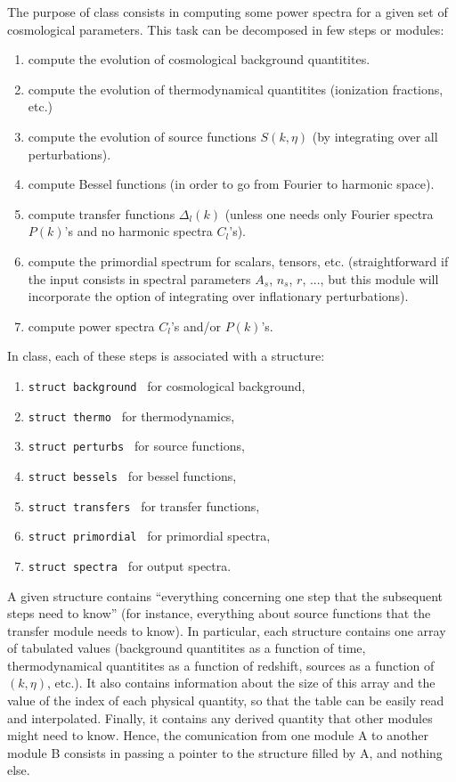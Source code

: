 \documentclass{article}
\begin{document}
The purpose of {\sc class} consists in computing some power spectra for a
given set of cosmological parameters. This task can be decomposed in few steps
or modules:
\begin{enumerate}
\item
compute the evolution of cosmological background quantitites.
\item
compute the evolution of thermodynamical quantitites (ionization fractions, etc.)
\item
compute the evolution of source functions $S(k,\eta)$ (by integrating over all perturbations).
\item
compute Bessel functions (in order to go from Fourier to harmonic space).
\item
compute transfer functions $\Delta_l(k)$ (unless one needs only Fourier spectra $P(k)$'s and no harmonic spectra $C_l$'s).
\item
compute the primordial spectrum for scalars, tensors, etc.
(straightforward if the input consists in spectral parameters $A_s$,
$n_s$, $r$, ..., but this module will incorporate the option of integrating
over inflationary perturbations).
\item
compute power spectra $C_l$'s and/or $P(k)$'s.
\end{enumerate}
In {\sc class}, each of these steps is associated with a structure:
\begin{enumerate}
\item {\tt  struct background }      for cosmological background,
\item {\tt  struct thermo      }     for thermodynamics,
\item {\tt  struct perturbs     }    for source functions,
\item {\tt  struct bessels  }        for bessel functions,
\item {\tt  struct transfers }       for transfer functions,
\item {\tt  struct primordial }      for primordial spectra,
\item {\tt  struct spectra     }     for output spectra. 
\end{enumerate}
A given structure contains ``everything concerning one step that the
subsequent steps need to know'' (for instance, everything about source
functions that the transfer module needs to know). In particular, each
structure contains one array of tabulated values (background
quantitites as a function of time, thermodynamical quantitites as a
function of redshift, sources as a function of $(k, \eta)$, etc.).  It
also contains information about the size of this array and the value
of the index of each physical quantity, so that the table can be
easily read and interpolated. Finally, it contains any derived
quantity that other modules might need to know. Hence, the
comunication from one module A to another module B
consists in passing a pointer to the structure filled by A, and nothing else.
\end{document}
